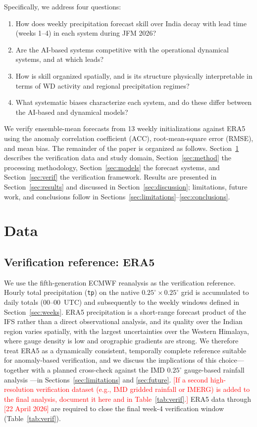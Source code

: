 \documentclass[11pt]{article}
\newcommand{\ph}[1]{\textcolor{red}{[#1]}}
\begin{document}
Specifically, we address four questions:
\begin{enumerate}
  \item How does weekly precipitation forecast skill over India decay
        with lead time (weeks 1--4) in each system during JFM 2026?
  \item Are the AI-based systems competitive with the operational
        dynamical systems, and at which leads?
  \item How is skill organized spatially, and is its structure
        physically interpretable in terms of WD activity and regional
        precipitation regimes?
  \item What systematic biases characterize each system, and do these
        differ between the AI-based and dynamical models?
\end{enumerate}
We verify ensemble-mean forecasts from 13 weekly initializations
against ERA5 using the anomaly correlation coefficient (ACC),
root-mean-square error (RMSE), and mean bias. The remainder of the
paper is organized as follows. Section~\ref{sec:data} describes the
verification data and study domain, Section~\ref{sec:method} the
processing methodology, Section~\ref{sec:models} the forecast systems,
and Section~\ref{sec:verif} the verification framework. Results are
presented in Section~\ref{sec:results} and discussed in
Section~\ref{sec:discussion}; limitations, future work, and conclusions
follow in Sections~\ref{sec:limitations}--\ref{sec:conclusions}.

\section{Data}\label{sec:data}

\subsection{Verification reference: ERA5}\label{sec:era5}

We use the fifth-generation ECMWF reanalysis
\citep[ERA5;][]{hersbach2020} as the verification reference. Hourly
total precipitation (\texttt{tp}) on the native
$0.25^{\circ}\times0.25^{\circ}$ grid is accumulated to daily totals
(00--00~UTC) and subsequently to the weekly windows defined in
Section~\ref{sec:weeks}. ERA5 precipitation is a short-range forecast
product of the IFS rather than a direct observational analysis, and its
quality over the Indian region varies spatially, with the largest
uncertainties over the Western Himalaya, where gauge density is low and
orographic gradients are strong. We therefore treat ERA5 as a
dynamically consistent, temporally complete reference suitable for
anomaly-based verification, and we discuss the implications of this
choice---together with a planned cross-check against the IMD
$0.25^{\circ}$ gauge-based rainfall analysis \citep{pai2014}---in
Sections~\ref{sec:limitations} and \ref{sec:future}.
\ph{If a second high-resolution verification dataset (e.g., IMD gridded
rainfall or IMERG) is added to the final analysis, document it here and
in Table~\ref{tab:verif}.} ERA5 data through \ph{22 April 2026} are
required to close the final week-4 verification window
(Table~\ref{tab:verif}).
\end{document}
